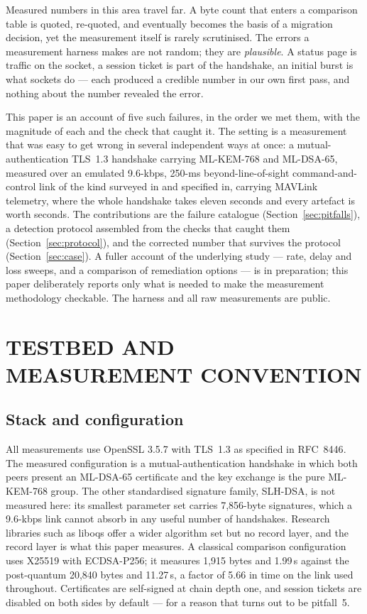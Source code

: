 \documentclass[]{spie}  %
\begin{document}
Measured numbers in this area travel far. A byte count that enters a
comparison table is quoted, re-quoted, and eventually becomes the basis
of a migration decision, yet the measurement itself is rarely
scrutinised. The errors a measurement harness makes are not random; they
are \emph{plausible}. A status page is traffic on the socket, a session
ticket is part of the handshake, an initial burst is what sockets do ---
each produced a credible number in our own first pass, and nothing about
the number revealed the error.

This paper is an account of five such failures, in the order we met
them, with the magnitude of each and the check that caught it. The
setting is a measurement that was easy to get wrong in several
independent ways at once: a mutual-authentication TLS~1.3 handshake
carrying ML-KEM-768 and ML-DSA-65\cite{fips203,fips204}, measured over
an emulated 9.6-kbps, 250-ms beyond-line-of-sight command-and-control
link of the kind surveyed in\cite{zeng2016} and specified
in\cite{do362}, carrying MAVLink telemetry\cite{mavlink}, where the
whole handshake takes eleven seconds and every artefact is worth
seconds. The contributions are the failure catalogue
(Section~\ref{sec:pitfalls}), a detection protocol assembled from the
checks that caught them (Section~\ref{sec:protocol}), and the corrected
number that survives the protocol (Section~\ref{sec:case}). A fuller
account of the underlying study --- rate, delay and loss sweeps, and a
comparison of remediation options --- is in preparation; this paper
deliberately reports only what is needed to make the measurement
methodology checkable. The harness and all raw measurements are
public\cite{measurepackage}.

\section{TESTBED AND MEASUREMENT CONVENTION}
\label{sec:testbed}

\subsection{Stack and configuration}

All measurements use OpenSSL 3.5.7\cite{openssl35} with TLS~1.3 as
specified in RFC~8446\cite{rfc8446}. The measured configuration is a
mutual-authentication handshake in which both peers present an
ML-DSA-65 certificate\cite{fips204} and the key exchange is the pure
ML-KEM-768 group\cite{fips203}. The other standardised signature family,
SLH-DSA, is not measured here: its smallest parameter set carries
7{,}856-byte signatures\cite{fips205}, which a 9.6-kbps link cannot
absorb in any useful number of handshakes. Research libraries such as
liboqs offer a wider algorithm set but no record layer\cite{liboqs}, and
the record layer is what this paper measures. A classical comparison
configuration
uses X25519 with ECDSA-P256; it measures 1{,}915 bytes and 1.99\,s
against the post-quantum 20{,}840 bytes and 11.27\,s, a factor of
5.66 in time on the link used throughout. Certificates are self-signed
at chain depth one, and session tickets are disabled on both sides by
default --- for a reason that turns out to be pitfall~5.
\end{document}
